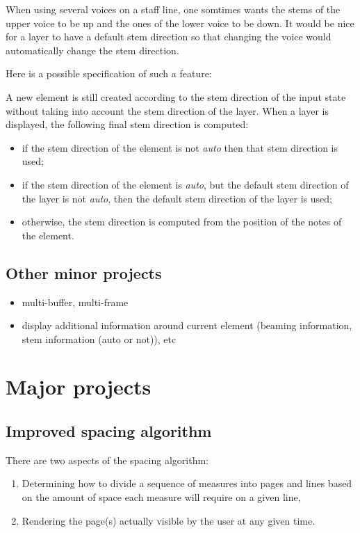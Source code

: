 When using several voices on a staff line, one somtimes wants the
stems of the upper voice to be up and the ones of the lower voice to
be down.  It would be nice for a layer to have a default stem
direction so that changing the voice would automatically change the
stem direction.  

Here is a possible specification of such a feature:

A new element is still created according to the stem direction of the
input state without taking into account the stem direction of the
layer.  When a layer is displayed, the following final stem direction
is computed:

\begin{itemize}
\item if the stem direction of the element is not \emph{auto} then
  that stem direction is used;
\item if the stem direction of the element is \emph{auto}, but the
  default stem direction of the layer is not \emph{auto}, then the
  default stem direction of the layer is used;
\item otherwise, the stem direction is computed from the position of
  the notes of the element. 
\end{itemize}

\subsection{Other minor projects}

\begin{itemize}
\item multi-buffer, multi-frame
\item display additional information around current element (beaming
  information, stem information (auto or not)), etc
\end{itemize}

\section{Major projects}

\subsection{Improved spacing algorithm}

There are two aspects of the spacing algorithm:

\begin{enumerate}
\item Determining how to divide a sequence of measures into pages and
  lines based on the amount of space each measure will require on a
  given line,
\item Rendering the page(s) actually visible by the user at any given
  time. 
\end{enumerate}

